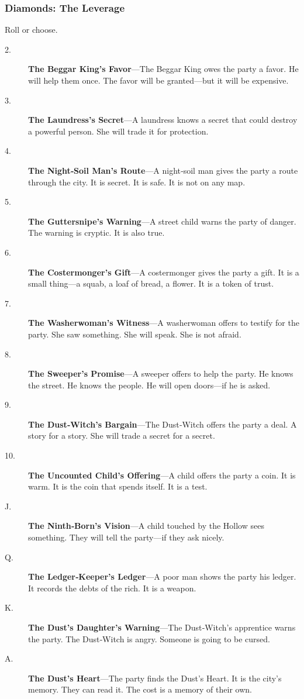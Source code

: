 \documentclass[11pt]{article}
\begin{document}
\subsubsection{Diamonds: The Leverage}
Roll or choose.

\begin{description}
\item[2.] \textbf{The Beggar King's Favor}—The Beggar King owes the party a favor. He will help them once. The favor will be granted—but it will be expensive.
\item[3.] \textbf{The Laundress's Secret}—A laundress knows a secret that could destroy a powerful person. She will trade it for protection.
\item[4.] \textbf{The Night‑Soil Man's Route}—A night‑soil man gives the party a route through the city. It is secret. It is safe. It is not on any map.
\item[5.] \textbf{The Guttersnipe's Warning}—A street child warns the party of danger. The warning is cryptic. It is also true.
\item[6.] \textbf{The Costermonger's Gift}—A costermonger gives the party a gift. It is a small thing—a squab, a loaf of bread, a flower. It is a token of trust.
\item[7.] \textbf{The Washerwoman's Witness}—A washerwoman offers to testify for the party. She saw something. She will speak. She is not afraid.
\item[8.] \textbf{The Sweeper's Promise}—A sweeper offers to help the party. He knows the street. He knows the people. He will open doors—if he is asked.
\item[9.] \textbf{The Dust‑Witch's Bargain}—The Dust‑Witch offers the party a deal. A story for a story. She will trade a secret for a secret.
\item[10.] \textbf{The Uncounted Child's Offering}—A child offers the party a coin. It is warm. It is the coin that spends itself. It is a test.
\item[J.] \textbf{The Ninth‑Born's Vision}—A child touched by the Hollow sees something. They will tell the party—if they ask nicely.
\item[Q.] \textbf{The Ledger‑Keeper's Ledger}—A poor man shows the party his ledger. It records the debts of the rich. It is a weapon.
\item[K.] \textbf{The Dust's Daughter's Warning}—The Dust‑Witch’s apprentice warns the party. The Dust‑Witch is angry. Someone is going to be cursed.
\item[A.] \textbf{The Dust's Heart}—The party finds the Dust’s Heart. It is the city’s memory. They can read it. The cost is a memory of their own.
\end{description}
\end{document}
